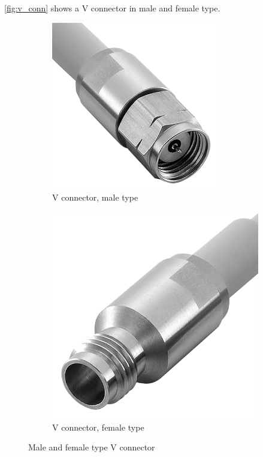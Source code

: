 \autoref{fig:v_conn} shows a V connector in male and female type.
\begin{figure}[tb]
	\centering
	\begin{subfigure}{0.4\textwidth}
		\centering
		\includegraphics[width=0.8\textwidth]{chap/04-theresa/img/connectors/v_m}  
		\caption{V connector, male type}
		\label{fig:v_m}
	\end{subfigure}
	\hfill
	\begin{subfigure}{0.4\textwidth}
		\centering
		\includegraphics[height=0.8\textwidth]{chap/04-theresa/img/connectors/v_f}  
		\caption{V connector, female type}
		\label{fig:v_f}
	\end{subfigure}
	\caption{Male and female type V connector}
	\label{fig:v_conn}
\end{figure}

